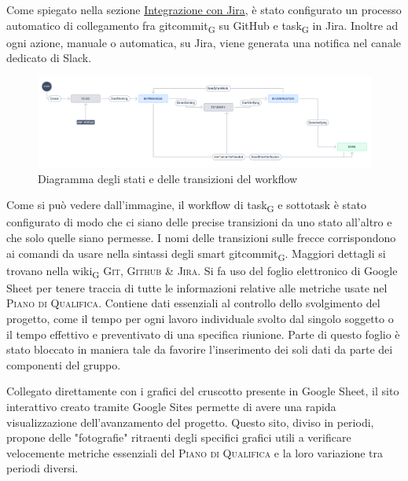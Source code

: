         Come spiegato nella sezione \hyperref[jiraintegration]{Integrazione con Jira}, è stato configurato un processo automatico di collegamento fra gitcommit\textsubscript{G} su GitHub e task\textsubscript{G} in Jira. Inoltre ad ogni azione, manuale o automatica, su Jira, viene generata una notifica nel canale dedicato di Slack.
        \begin{figure}[H]
            \centering
            \includegraphics[scale=0.32]{res/images/jira_workflow.png}
            \caption{Diagramma degli stati e delle transizioni del workflow}
        \end{figure}
            Come si può vedere dall'immagine, il workflow di task\textsubscript{G} e sottotask è stato configurato di modo che ci siano delle precise transizioni da uno stato all'altro e che solo quelle siano permesse. I nomi delle transizioni sulle frecce corrispondono ai comandi da usare nella sintassi degli smart gitcommit\textsubscript{G}. Maggiori dettagli si trovano nella wiki\textsubscript{G} \textsc{Git, Github \& Jira}.
        Si fa uso del foglio elettronico di Google Sheet per tenere traccia di tutte le informazioni relative alle metriche usate nel \textsc{Piano di Qualifica}. Contiene dati essenziali al controllo dello svolgimento del progetto, come il tempo per ogni lavoro individuale svolto dal singolo soggetto o il tempo effettivo e preventivato di una specifica riunione. Parte di questo foglio è stato bloccato in maniera tale da favorire l'inserimento dei soli dati da parte dei componenti del gruppo.
        
        Collegato direttamente con i grafici del cruscotto presente in Google Sheet, il sito interattivo creato tramite Google Sites permette di avere una rapida visualizzazione dell'avanzamento del progetto. Questo sito, diviso in periodi, propone delle "fotografie" ritraenti degli specifici grafici utili a verificare velocemente metriche essenziali del \textsc{Piano di Qualifica} e la loro variazione tra periodi diversi.
        
